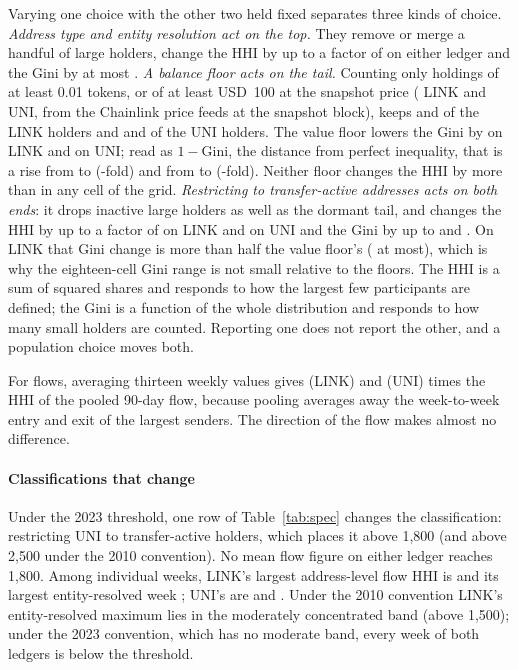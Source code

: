 Varying one choice with the other two held fixed separates three kinds of
choice. \emph{Address type and entity resolution act on the top.} They
remove or merge a handful of large holders, change the HHI by up to a
factor of  on either ledger and the Gini by at most
. \emph{A balance floor acts on the tail.} Counting only
holdings of at least 0.01 tokens, or of at least USD~100 at the snapshot price
( LINK and  UNI, from the Chainlink price
feeds at the snapshot block), keeps  and  of
the  LINK holders and  and  of
the  UNI holders. The value floor lowers the Gini by
 on LINK and  on UNI; read as
$1-\mathrm{Gini}$, the distance from perfect inequality, that is a rise from
 to  (-fold) and from
 to  (-fold). Neither
floor changes the HHI by more than  in any cell of
the grid. \emph{Restricting to transfer-active addresses acts on both ends}:
it drops inactive large holders as well as the dormant tail, and changes the
HHI by up to a factor of  on LINK and
 on UNI and the Gini by up to
 and . On LINK that Gini
change is more than half the value floor's ( at most),
which is why the eighteen-cell Gini range is not small relative to the
floors. The HHI is a sum of squared shares and responds to how the largest
few participants are defined; the Gini is a function of the whole
distribution and responds to how many small holders are counted. Reporting
one does not report the other, and a population choice moves both.

For flows, averaging thirteen weekly values gives 
(LINK) and  (UNI) times the HHI of the pooled 90-day
flow, because pooling averages away the week-to-week entry and exit of the
largest senders. The direction of the flow makes almost no difference.

\paragraph{Classifications that change}
Under the 2023 threshold, one row of Table~\ref{tab:spec} changes the
classification: restricting UNI to transfer-active holders, which places it
above 1{,}800 (and above 2{,}500 under the 2010 convention). No mean flow
figure on either ledger reaches 1{,}800. Among individual weeks, LINK's
largest address-level flow HHI is  and its largest
entity-resolved week ; UNI's are  and
. Under the 2010 convention LINK's entity-resolved
maximum lies in the moderately concentrated band (above 1{,}500); under the
2023 convention, which has no moderate band, every week of both ledgers is
below the threshold.

